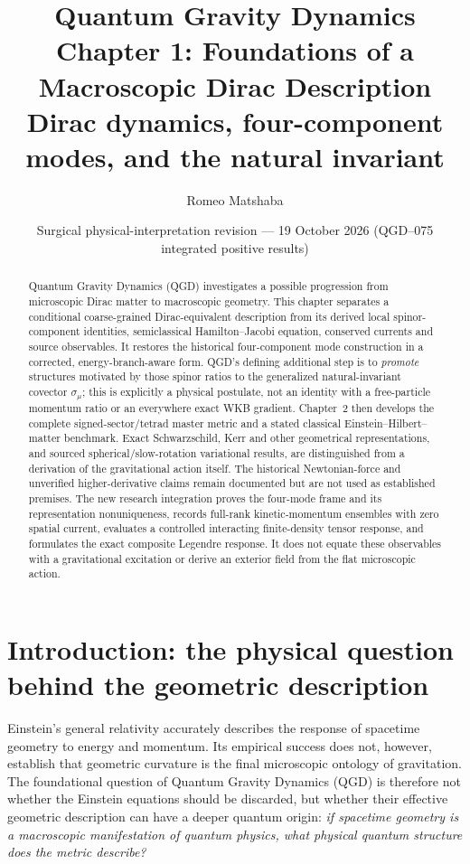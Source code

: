 \documentclass[11pt,a4paper]{article}
\title{\vspace{-9mm}\textbf{Quantum Gravity Dynamics}\\[4pt]
\large Chapter 1: Foundations of a Macroscopic Dirac Description\\[6pt]
\normalsize Dirac dynamics, four-component modes, and the natural invariant}
\author{Romeo Matshaba}
\date{Surgical physical-interpretation revision --- 19 October 2026 (QGD--075 integrated positive results)}
\begin{document}
\maketitle
\begin{abstract}
Quantum Gravity Dynamics (QGD) investigates a possible progression from microscopic Dirac matter to macroscopic geometry. This chapter separates a conditional coarse-grained Dirac-equivalent description from its derived local spinor-component identities, semiclassical Hamilton--Jacobi equation, conserved currents and source observables. It restores the historical four-component mode construction in a corrected, energy-branch-aware form. QGD's defining additional step is to \emph{promote} structures motivated by those spinor ratios to the generalized natural-invariant covector $\sigma_\mu$; this is explicitly a physical postulate, not an identity with a free-particle momentum ratio or an everywhere exact WKB gradient. Chapter~2 then develops the complete signed-sector/tetrad master metric and a stated classical Einstein--Hilbert--matter benchmark. Exact Schwarzschild, Kerr and other geometrical representations, and sourced spherical/slow-rotation variational results, are distinguished from a derivation of the gravitational action itself. The historical Newtonian-force and unverified higher-derivative claims remain documented but are not used as established premises. The new research integration proves the four-mode frame and its representation nonuniqueness, records full-rank kinetic-momentum ensembles with zero spatial current, evaluates a controlled interacting finite-density tensor response, and formulates the exact composite Legendre response. It does not equate these observables with a gravitational excitation or derive an exterior field from the flat microscopic action.
\end{abstract}

\section*{Introduction: the physical question behind the geometric description}
Einstein's general relativity accurately describes the response of spacetime
geometry to energy and momentum.  Its empirical success does not, however,
establish that geometric curvature is the final microscopic ontology of
gravitation.  The foundational question of Quantum Gravity Dynamics (QGD)
is therefore not whether the Einstein equations should be discarded, but
whether their effective geometric description can have a deeper quantum
origin: \emph{if spacetime geometry is a macroscopic manifestation of quantum
physics, what physical quantum structure does the metric describe?}
\end{document}
